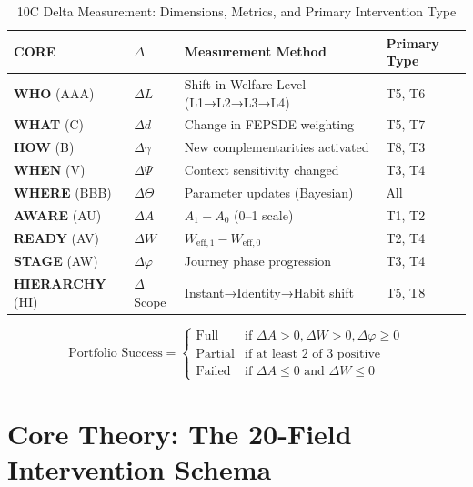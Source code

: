 \begin{table}[htbp]
\centering
\caption{10C Delta Measurement: Dimensions, Metrics, and Primary Intervention Type}
\label{tab:hhh-9c-delta-measurement}
\renewcommand{\arraystretch}{1.4}
\footnotesize
\begin{tabular}{@{}llp{4.5cm}l@{}}
\toprule
\textbf{CORE} & \textbf{$\Delta$} & \textbf{Measurement Method} & \textbf{Primary Type} \\
\midrule
\textbf{WHO} (AAA) & $\Delta L$ & Shift in Welfare-Level (L1→L2→L3→L4) & T5, T6 \\
\textbf{WHAT} (C) & $\Delta d$ & Change in FEPSDE weighting & T5, T7 \\
\textbf{HOW} (B) & $\Delta\gamma$ & New complementarities activated & T8, T3 \\
\textbf{WHEN} (V) & $\Delta\Psi$ & Context sensitivity changed & T3, T4 \\
\textbf{WHERE} (BBB) & $\Delta\Theta$ & Parameter updates (Bayesian) & All \\
\textbf{AWARE} (AU) & $\Delta A$ & $A_1 - A_0$ (0--1 scale) & T1, T2 \\
\textbf{READY} (AV) & $\Delta W$ & $W_{\text{eff},1} - W_{\text{eff},0}$ & T2, T4 \\
\textbf{STAGE} (AW) & $\Delta\varphi$ & Journey phase progression & T3, T4 \\
\textbf{HIERARCHY} (HI) & $\Delta$Scope & Instant→Identity→Habit shift & T5, T8 \\
\bottomrule
\end{tabular}
\end{table}

\begin{tcolorbox}[colback=gray!5!white, colframe=gray!75!black,
    title=Definition HHH-D0b: Portfolio Success Criteria]
\begin{equation}
\text{Portfolio Success} = \begin{cases}
\text{Full} & \text{if } \Delta A > 0, \Delta W > 0, \Delta\varphi \geq 0 \\
\text{Partial} & \text{if at least 2 of 3 positive} \\
\text{Failed} & \text{if } \Delta A \leq 0 \text{ and } \Delta W \leq 0
\end{cases}
\end{equation}
\end{tcolorbox}


\section{Core Theory: The 20-Field Intervention Schema}
\label{sec:hhh-theory}

